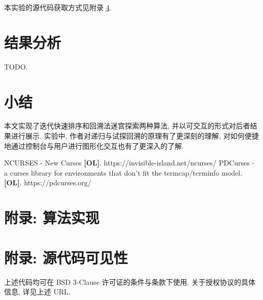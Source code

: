\documentclass[a4paper]{article}
\begin{document}
本实验的源代码获取方式见附录 \ref{appendix_source_code}.

\section{结果分析}

TODO.

\section{小结}

本文实现了迭代快速排序和回溯法迷宫探索两种算法, 并以可交互的形式对后者结果进行展示.  实验中, 作者对递归与试探回溯的原理有了更深刻的理解, 对如何便捷地通过控制台与用户进行图形化交互也有了更深入的了解.

\begin{thebibliography}{}

 NCURSES - New Curses \textbf{[OL]}. https://invisible-island.net/ncurses/
 PDCurses - a curses library for environments that don't fit the termcap/terminfo model. \textbf{[OL]}. https://pdcurses.org/

\end{thebibliography}

\appendix

\section{附录: 算法实现}



\section{附录: 源代码可见性}
\label{appendix_source_code}

上述代码均可在 BSD 3-Clause 许可证的条件与条款下使用. 关于授权协议的具体信息, 详见上述 URL.
\end{document}
